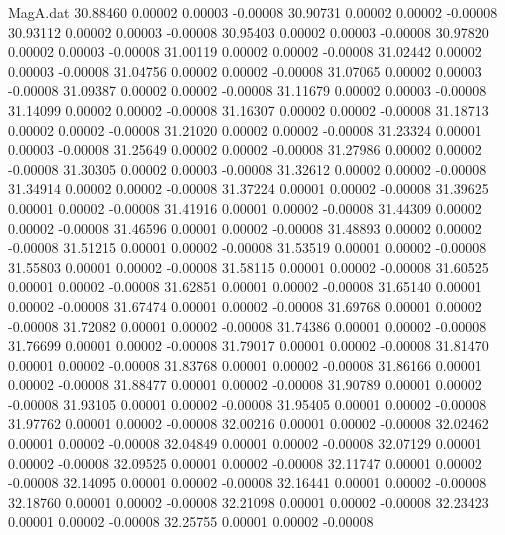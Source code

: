 \begin{filecontents}{MagA.dat}
  30.88460    0.00002    0.00003   -0.00008
  30.90731    0.00002    0.00002   -0.00008
  30.93112    0.00002    0.00003   -0.00008
  30.95403    0.00002    0.00003   -0.00008
  30.97820    0.00002    0.00003   -0.00008
  31.00119    0.00002    0.00002   -0.00008
  31.02442    0.00002    0.00003   -0.00008
  31.04756    0.00002    0.00002   -0.00008
  31.07065    0.00002    0.00003   -0.00008
  31.09387    0.00002    0.00002   -0.00008
  31.11679    0.00002    0.00003   -0.00008
  31.14099    0.00002    0.00002   -0.00008
  31.16307    0.00002    0.00002   -0.00008
  31.18713    0.00002    0.00002   -0.00008
  31.21020    0.00002    0.00002   -0.00008
  31.23324    0.00001    0.00003   -0.00008
  31.25649    0.00002    0.00002   -0.00008
  31.27986    0.00002    0.00002   -0.00008
  31.30305    0.00002    0.00003   -0.00008
  31.32612    0.00002    0.00002   -0.00008
  31.34914    0.00002    0.00002   -0.00008
  31.37224    0.00001    0.00002   -0.00008
  31.39625    0.00001    0.00002   -0.00008
  31.41916    0.00001    0.00002   -0.00008
  31.44309    0.00002    0.00002   -0.00008
  31.46596    0.00001    0.00002   -0.00008
  31.48893    0.00002    0.00002   -0.00008
  31.51215    0.00001    0.00002   -0.00008
  31.53519    0.00001    0.00002   -0.00008
  31.55803    0.00001    0.00002   -0.00008
  31.58115    0.00001    0.00002   -0.00008
  31.60525    0.00001    0.00002   -0.00008
  31.62851    0.00001    0.00002   -0.00008
  31.65140    0.00001    0.00002   -0.00008
  31.67474    0.00001    0.00002   -0.00008
  31.69768    0.00001    0.00002   -0.00008
  31.72082    0.00001    0.00002   -0.00008
  31.74386    0.00001    0.00002   -0.00008
  31.76699    0.00001    0.00002   -0.00008
  31.79017    0.00001    0.00002   -0.00008
  31.81470    0.00001    0.00002   -0.00008
  31.83768    0.00001    0.00002   -0.00008
  31.86166    0.00001    0.00002   -0.00008
  31.88477    0.00001    0.00002   -0.00008
  31.90789    0.00001    0.00002   -0.00008
  31.93105    0.00001    0.00002   -0.00008
  31.95405    0.00001    0.00002   -0.00008
  31.97762    0.00001    0.00002   -0.00008
  32.00216    0.00001    0.00002   -0.00008
  32.02462    0.00001    0.00002   -0.00008
  32.04849    0.00001    0.00002   -0.00008
  32.07129    0.00001    0.00002   -0.00008
  32.09525    0.00001    0.00002   -0.00008
  32.11747    0.00001    0.00002   -0.00008
  32.14095    0.00001    0.00002   -0.00008
  32.16441    0.00001    0.00002   -0.00008
  32.18760    0.00001    0.00002   -0.00008
  32.21098    0.00001    0.00002   -0.00008
  32.23423    0.00001    0.00002   -0.00008
  32.25755    0.00001    0.00002   -0.00008

\end{filecontents}
